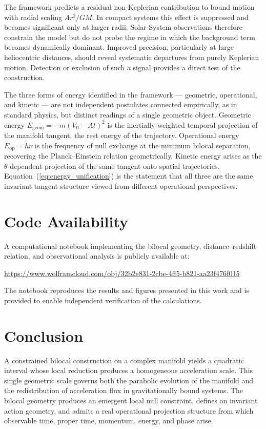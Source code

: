 \documentclass[fontsize=12pt, paper=a4]{scrartcl}
\begin{document}
The framework predicts a residual non-Keplerian contribution to bound motion with radial scaling $A r^2/GM$. In compact systems this effect is suppressed and becomes significant only at larger radii. Solar-System observations therefore constrain the model but do not probe the regime in which the background term becomes dynamically dominant. Improved precision, particularly at large heliocentric distances, should reveal systematic departures from purely Keplerian motion. Detection or exclusion of such a signal provides a direct test of the construction.

The three forms of energy identified in the framework — geometric, operational, and kinetic — are not independent postulates connected empirically, as in standard physics, but distinct readings of a single geometric object. Geometric energy $E_{\mathrm{geom}} = -m(V_0-At)^2$ is the inertially weighted temporal projection of the manifold tangent, the rest energy of the trajectory. Operational energy $E_{\mathrm{op}} = h\nu$ is the frequency of null exchange at the minimum bilocal separation, recovering the Planck--Einstein relation geometrically. Kinetic energy arises as the $\theta$-dependent projection of the same tangent onto spatial trajectories. Equation~(\ref{eq:energy_unification}) is the statement that all three are the same invariant tangent structure viewed from different operational perspectives.

\section{Code Availability}

A computational notebook implementing the bilocal geometry, distance--redshift relation, and observational analysis is publicly available at:
\begin{center}
\url{https://www.wolframcloud.com/obj/32b2e831-2cbe-4ff5-b821-aa23f476f015}
\end{center}
The notebook reproduces the results and figures presented in this work and is provided to enable independent verification of the calculations.

\section{Conclusion}

A constrained bilocal construction on a complex manifold yields a quadratic interval whose local reduction produces a homogeneous acceleration scale. This single geometric scale governs both the parabolic evolution of the manifold and the redistribution of acceleration flux in gravitationally bound systems. The bilocal geometry produces an emergent local null constraint, defines an invariant action geometry, and admits a real operational projection structure from which observable time, proper time, momentum, energy, and phase arise.
\end{document}
